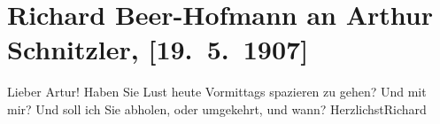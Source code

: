 

         \renewcommand{\erwaehnteOrte}{Orte: Wien}
         \renewcommand{\erwaehnteWerke}{}
               \section[Richard Beer-Hofmann an Arthur Schnitzler, {[}19. 5. 1907{]}]{ Richard Beer-Hofmann an Arthur Schnitzler, {[}19. 5. 1907{]}}\nopagebreak{}\rehead{ }\begin{ledgroupsized}[t]{13cm}\normalsize\beginnumbering \toendnotes[C]{\smallbreak\pagebreak[2]} 
\pstart
           \noindent{}{\pb}Lieber Artur! Haben Sie Lust heute Vormittags spazieren zu gehen?
               Und mit mir? Und soll ich Sie abholen, oder umgekehrt, und wann?\pend
           \pstart Herzlichst\spacefill\mbox{Richard}\pend{}
         
         \endnumbering{}\end{ledgroupsized}  \newcommand{\dateiname}{L01675}\newcommand{\titel}{Richard Beer-Hofmann an Arthur Schnitzler, [19. 5. 1907]}\newcommand{\editorInnen}{Martin Anton Müller und Gerd-Hermann Susen}
      